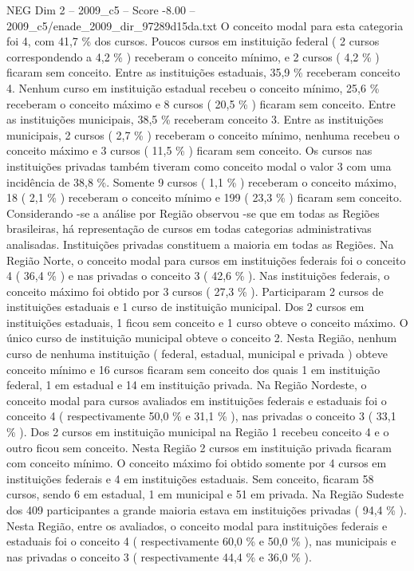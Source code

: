 \begin{textsample}{NEG Dim 2 – 2009\_c5 – Score -8.00 – 2009\_c5/enade\_2009\_dir\_97289d15da.txt}
O conceito modal para esta categoria foi 4, com 41,7 \% dos cursos.
Poucos cursos em instituição federal ( 2 cursos correspondendo a 4,2 \% ) receberam o conceito mínimo, e 2 cursos ( 4,2 \% ) ficaram sem conceito.
Entre as instituições estaduais, 35,9 \% receberam conceito 4.
Nenhum curso em instituição estadual recebeu o conceito mínimo, 25,6 \% receberam o conceito máximo e 8 cursos ( 20,5 \% ) ficaram sem conceito.
Entre as instituições municipais, 38,5 \% receberam conceito 3.
Entre as instituições municipais, 2 cursos ( 2,7 \% ) receberam o conceito mínimo, nenhuma recebeu o conceito máximo e 3 cursos ( 11,5 \% ) ficaram sem conceito.
Os cursos nas instituições privadas também tiveram como conceito modal o valor 3 com uma incidência de 38,8 \%.
Somente 9 cursos ( 1,1 \% ) receberam o conceito máximo, 18 ( 2,1 \% ) receberam o conceito mínimo e 199 ( 23,3 \% ) ficaram sem conceito.
Considerando -se a análise por Região observou -se que em todas as Regiões brasileiras, há representação de cursos em todas categorias administrativas analisadas.
Instituições privadas constituem a maioria em todas as Regiões.
Na Região Norte, o conceito modal para cursos em instituições federais foi o conceito 4 ( 36,4 \% ) e nas privadas o conceito 3 ( 42,6 \% ).
Nas instituições federais, o conceito máximo foi obtido por 3 cursos ( 27,3 \% ).
Participaram 2 cursos de instituições estaduais e 1 curso de instituição municipal.
Dos 2 cursos em instituições estaduais, 1 ficou sem conceito e 1 curso obteve o conceito máximo.
O único curso de instituição municipal obteve o conceito 2.
Nesta Região, nenhum curso de nenhuma instituição ( federal, estadual, municipal e privada ) obteve conceito mínimo e 16 cursos ficaram sem conceito dos quais 1 em instituição federal, 1 em estadual e 14 em instituição privada.
Na Região Nordeste, o conceito modal para cursos avaliados em instituições federais e estaduais foi o conceito 4 ( respectivamente 50,0 \% e 31,1 \% ), nas privadas o conceito 3 ( 33,1 \% ).
Dos 2 cursos em instituição municipal na Região 1 recebeu conceito 4 e o outro ficou sem conceito.
Nesta Região 2 cursos em instituição privada ficaram com conceito mínimo.
O conceito máximo foi obtido somente por 4 cursos em instituições federais e 4 em instituições estaduais.
Sem conceito, ficaram 58 cursos, sendo 6 em estadual, 1 em municipal e 51 em privada.
Na Região Sudeste dos 409 participantes a grande maioria estava em instituições privadas ( 94,4 \% ).
Nesta Região, entre os avaliados, o conceito modal para instituições federais e estaduais foi o conceito 4 ( respectivamente 60,0 \% e 50,0 \% ), nas municipais e nas privadas o conceito 3 ( respectivamente 44,4 \% e 36,0 \% ).

\end{textsample}
